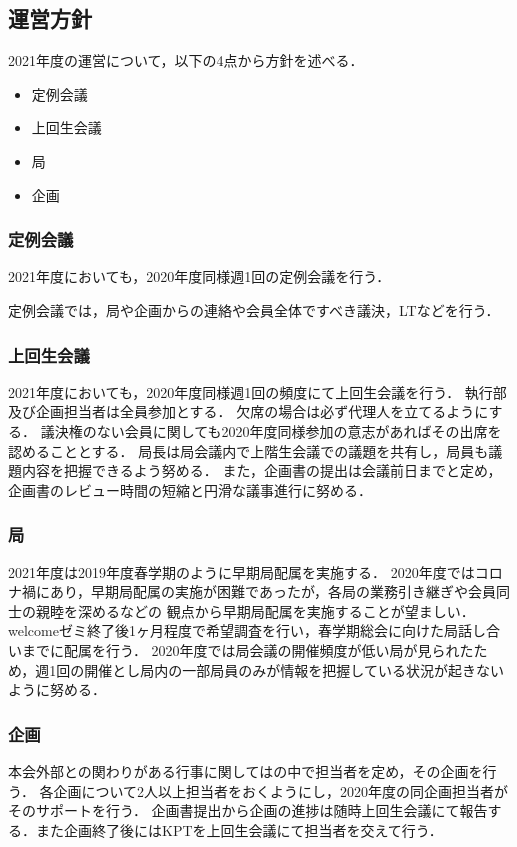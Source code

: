 \subsection*{運営方針}


2021年度の運営について，以下の4点から方針を述べる．
\begin{itemize}
    \item 定例会議
    \item 上回生会議
    \item 局
    \item 企画
\end{itemize}

\subsubsection*{定例会議}
2021年度においても，2020年度同様週1回の定例会議を行う．

定例会議では，局や企画からの連絡や会員全体ですべき議決，LTなどを行う．

\subsubsection*{上回生会議}
2021年度においても，2020年度同様週1回の頻度にて上回生会議を行う．
執行部及び企画担当者は全員参加とする．
欠席の場合は必ず代理人を立てるようにする．
議決権のない会員に関しても2020年度同様参加の意志があればその出席を認めることとする．
局長は局会議内で上階生会議での議題を共有し，局員も議題内容を把握できるよう努める．
また，企画書の提出は会議前日までと定め，企画書のレビュー時間の短縮と円滑な議事進行に努める．

\subsubsection*{局}
2021年度は2019年度春学期のように早期局配属を実施する．
2020年度ではコロナ禍にあり，早期局配属の実施が困難であったが，各局の業務引き継ぎや会員同士の親睦を深めるなどの
観点から早期局配属を実施することが望ましい．
welcomeゼミ終了後1ヶ月程度で希望調査を行い，春学期総会に向けた局話し合いまでに配属を行う．
2020年度では局会議の開催頻度が低い局が見られたため，週1回の開催とし局内の一部局員のみが情報を把握している状況が起きないように努める．

\subsubsection*{企画}
本会外部との関わりがある行事に関しては\secondGrade{}の中で担当者を定め，その企画を行う．
各企画について2人以上担当者をおくようにし，2020年度の同企画担当者がそのサポートを行う．
企画書提出から企画の進捗は随時上回生会議にて報告する．また企画終了後にはKPTを上回生会議にて担当者を交えて行う．
